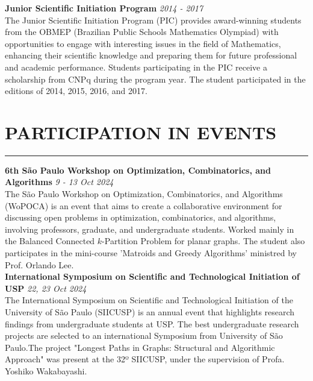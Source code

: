 \documentclass[a4paper,10pt]{article}
\begin{document}
\noindent\textbf{Junior Scientific Initiation Program} \hfill \textit{2014 - 2017} \\
The Junior Scientific Initiation Program (PIC) provides award-winning students from the OBMEP (Brazilian Public Schools Mathematics Olympiad) with opportunities to engage with interesting issues in the field of Mathematics, enhancing their scientific knowledge and preparing them for future professional and academic performance. Students participating in the PIC receive a scholarship from CNPq during the program year. The student participated in the editions of 2014, 2015, 2016, and 2017.


\vspace{0.2cm}
\section*{PARTICIPATION IN EVENTS}
\vspace{-1.5em} %
\noindent\rule{\textwidth}{0.4pt} %

\noindent\textbf{6th São Paulo Workshop on Optimization, Combinatorics, and Algorithms} \hfill \textit{9 - 13 Oct 2024}\\
The São Paulo Workshop on Optimization, Combinatorics, and Algorithms (WoPOCA) is an event that aims to create a collaborative environment for discussing open problems in optimization, combinatorics, and algorithms, involving professors, graduate, and undergraduate students. Worked mainly in the Balanced Connected \(k\)-Partition Problem for planar graphs. The student also participates in the mini-course 'Matroids and Greedy Algorithms' ministred by Prof. Orlando Lee. \\

\noindent\textbf{International Symposium on Scientific and Technological Initiation of USP} \hfill \textit{22, 23 Oct 2024}\\
The International Symposium on Scientific and Technological Initiation of the University of São Paulo (SIICUSP) is an annual event that highlights research findings from undergraduate students at USP. The best undergraduate research projects are selected to an international Symposium from University of São Paulo.The project "Longest Paths in Graphs: Structural and Algorithmic Approach" was present at the 32º SIICUSP, under the supervision of Profa. Yoshiko Wakabayashi. \\
\end{document}
